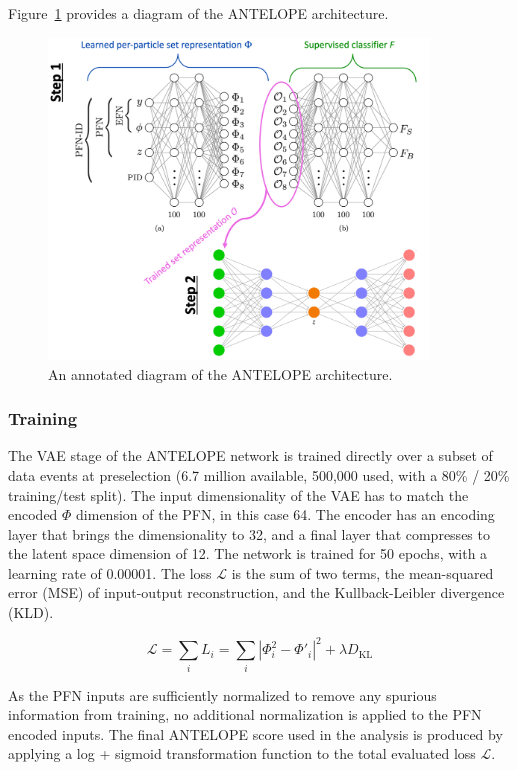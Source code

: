 Figure~\ref{fig:antelope_arch} provides a diagram of the ANTELOPE architecture.
\begin{figure}[!htbp]
\centering
   \includegraphics[width=0.9\textwidth]{figures/ml/antelope_arch}
    \caption{An annotated diagram of the ANTELOPE architecture.
    \label{fig:antelope_arch}}
\end{figure}


\subsubsection{Training}

The VAE stage of the ANTELOPE network is trained directly over a subset of data events at preselection (6.7 million available, 500,000 used, with a 80\% / 20\% training/test split).
The input dimensionality of the VAE has to match the encoded $\Phi$ dimension of the PFN, in this case 64. 
The encoder has an encoding layer that brings the dimensionality to 32, and a final layer that compresses to the latent space dimension of 12. 
The network is trained for 50 epochs, with a learning rate of 0.00001.  
The loss $\mathcal{L}$ is the sum of two terms, the mean-squared error (MSE) of input-output reconstruction, and the Kullback-Leibler divergence (KLD).

\begin{equation}
\label{eq:vrnnloss}
\mathcal{L} = \sum_i L_i = \sum_i | \Phi_i^2 - \Phi\prime_i |^2 + \lambda D_{\text{KL}}
\end{equation}

As the PFN inputs are sufficiently normalized to remove any spurious information from training, no additional normalization is applied to the PFN encoded inputs.
The final ANTELOPE score used in the analysis is produced by applying a log + sigmoid transformation function to the total evaluated loss $\mathcal{L}$. 

